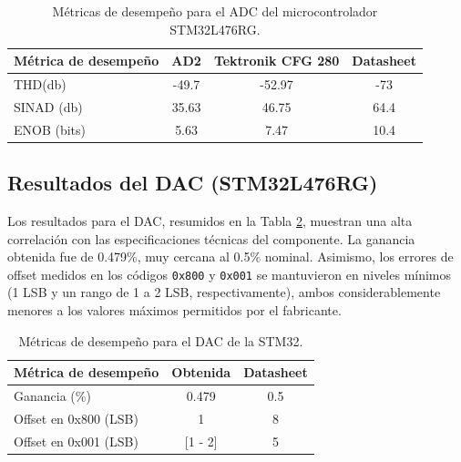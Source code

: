 \documentclass{article}
\begin{document}
\begin{table}[h]
    \centering
    \begin{tabular}{|l|c|c|c|}
        \hline
        \textbf{Métrica de desempeño} & \textbf{AD2} & \textbf{Tektronik CFG 280} & \textbf{Datasheet} \\ \hline
        THD(db)     & -49.7      & -52.97 & -73   \\ \hline
        SINAD (db)  & 35.63      & 46.75  & 64.4 \\ \hline
        ENOB (bits) & 5.63       & 7.47   & 10.4 \\ \hline
    \end{tabular}
    \caption{Métricas de desempeño para el ADC del microcontrolador STM32L476RG.}
    \label{tab:Tabla STMADC AC}
\end{table}
\subsection{Resultados del DAC (STM32L476RG)}
Los resultados para el DAC, resumidos en la Tabla \ref{tab:Tabla STMDAC}, muestran una alta correlación con las especificaciones técnicas del componente. La ganancia obtenida fue de 0.479\%, muy cercana al 0.5\% nominal. Asimismo, los errores de offset medidos en los códigos \texttt{0x800} y \texttt{0x001} se mantuvieron en niveles mínimos (1 LSB y un rango de 1 a 2 LSB, respectivamente), ambos considerablemente menores a los valores máximos permitidos por el fabricante.
\begin{table}[h]
    \centering
    \begin{tabular}{|l|c|c|}
        \hline
        \textbf{Métrica de desempeño} & \textbf{Obtenida} & \textbf{Datasheet} \\ \hline
        Ganancia (\%)          & 0.479     & 0.5 \\ \hline
        Offset en 0x800 (LSB)  & 1         & 8   \\ \hline
        Offset en 0x001 (LSB)  & [1 - 2]   & 5   \\ \hline
    \end{tabular}
    \caption{Métricas de desempeño para el DAC de la STM32.}
    \label{tab:Tabla STMDAC}
\end{table}
\end{document}
